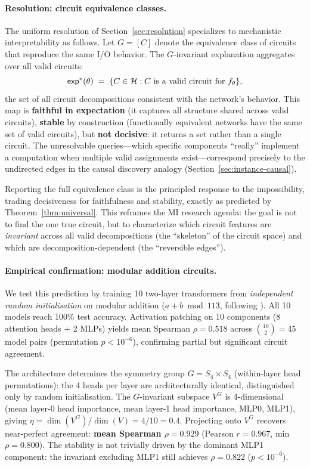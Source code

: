 \paragraph{Resolution: circuit equivalence classes.}
The uniform resolution of Section~\ref{sec:resolution} specializes to
mechanistic interpretability as follows.  Let $G = [C]$ denote the
equivalence class of circuits that reproduce the same I/O behavior.
The $G$-invariant explanation aggregates over all valid circuits:
\[
  \mathsf{exp}^*(\theta)
  \;=\;
  \{C \in \mathcal{H} : C \text{ is a valid circuit for } f_\theta\},
\]
the set of all circuit decompositions consistent with the network's
behavior.  This map is \textbf{faithful in expectation} (it captures
all structure shared across valid circuits), \textbf{stable} by
construction (functionally equivalent networks have the same set of
valid circuits), but \textbf{not decisive}: it returns a set rather
than a single circuit.  The unresolvable queries---which specific
components ``really'' implement a computation when multiple valid
assignments exist---correspond precisely to the undirected edges in
the causal discovery analogy (Section~\ref{sec:instance-causal}).

Reporting the full equivalence class is the principled response to the
impossibility, trading decisiveness for faithfulness and stability, exactly
as predicted by Theorem~\ref{thm:universal}.  This reframes the MI
research agenda: the goal is not to find the one true circuit, but to
characterize which circuit features are \emph{invariant} across all valid
decompositions (the ``skeleton'' of the circuit space) and which are
decomposition-dependent (the ``reversible edges'').

\paragraph{Empirical confirmation: modular addition circuits.}
We test this prediction by training 10 two-layer transformers from
\emph{independent random initialisation} on modular addition
($a + b \bmod 113$, following \citet{nanda2023progress}). All 10 models
reach 100\% test accuracy. Activation patching on 10 components (8
attention heads $+$ 2 MLPs) yields mean Spearman $\rho = 0.518$ across
$\binom{10}{2} = 45$ model pairs (permutation $p < 10^{-6}$), confirming
partial but significant circuit agreement.

The architecture determines the symmetry group $G = S_4 \times S_4$
(within-layer head permutations): the 4 heads per layer are
architecturally identical, distinguished only by random initialisation.
The $G$-invariant subspace $V^G$ is 4-dimensional (mean layer-0 head
importance, mean layer-1 head importance, MLP0, MLP1), giving
$\eta = \dim(V^G)/\dim(V) = 4/10 = 0.4$. Projecting onto $V^G$
recovers near-perfect agreement: \textbf{mean Spearman $\rho = 0.929$}
(Pearson $r = 0.967$, min $\rho = 0.800$). The stability is not
trivially driven by the dominant MLP1 component: the invariant excluding
MLP1 still achieves $\rho = 0.822$ ($p < 10^{-6}$).

